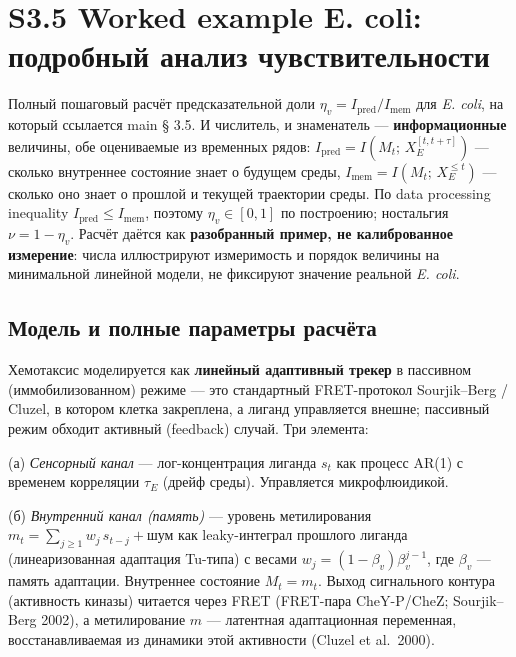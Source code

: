 \documentclass[pdflatex,sn-mathphys-ay]{sn-jnl}
\begin{document}
\section*{S3.5 Worked example E. coli: подробный анализ чувствительности}\label{s3.5-worked-example-e.-coli-ux43fux43eux434ux440ux43eux431ux43dux44bux439-ux430ux43dux430ux43bux438ux437-ux447ux443ux432ux441ux442ux432ux438ux442ux435ux43bux44cux43dux43eux441ux442ux438}

Полный пошаговый расчёт предсказательной доли \(\eta_v = I_{\text{pred}}/I_{\text{mem}}\) для \emph{E. coli}, на который ссылается main § 3.5. И числитель, и знаменатель --- \textbf{информационные} величины, обе оцениваемые из временных рядов: \(I_{\text{pred}} = I(M_t;\, X_E^{[t, t+\tau]})\) --- сколько внутреннее состояние знает о будущем среды, \(I_{\text{mem}} = I(M_t;\, X_E^{\le t})\) --- сколько оно знает о прошлой и текущей траектории среды. По data processing inequality \(I_{\text{pred}} \le I_{\text{mem}}\), поэтому \(\eta_v \in [0, 1]\) по построению; ностальгия \(\nu = 1 - \eta_v\). Расчёт даётся как \textbf{разобранный пример, не калиброванное измерение}: числа иллюстрируют измеримость и порядок величины на минимальной линейной модели, не фиксируют значение реальной \emph{E. coli}.

\subsection*{Модель и полные параметры расчёта}\label{ux43cux43eux434ux435ux43bux44c-ux438-ux43fux43eux43bux43dux44bux435-ux43fux430ux440ux430ux43cux435ux442ux440ux44b-ux440ux430ux441ux447ux451ux442ux430}

Хемотаксис моделируется как \textbf{линейный адаптивный трекер} в пассивном (иммобилизованном) режиме --- это стандартный FRET-протокол Sourjik--Berg / Cluzel, в котором клетка закреплена, а лиганд управляется внешне; пассивный режим обходит активный (feedback) случай. Три элемента:

(а) \emph{Сенсорный канал} --- лог-концентрация лиганда \(s_t\) как процесс AR(1) с временем корреляции \(\tau_E\) (дрейф среды). Управляется микрофлюидикой.

(б) \emph{Внутренний канал (память)} --- уровень метилирования \(m_t = \sum_{j \ge 1} w_j\, s_{t-j} + \text{шум}\) как leaky-интеграл прошлого лиганда (линеаризованная адаптация Tu-типа) с весами \(w_j = (1-\beta_v)\beta_v^{j-1}\), где \(\beta_v\) --- память адаптации. Внутреннее состояние \(M_t = m_t\). Выход сигнального контура (активность киназы) читается через FRET (FRET-пара CheY-P/CheZ; Sourjik--Berg 2002), а метилирование \(m\) --- латентная адаптационная переменная, восстанавливаемая из динамики этой активности (Cluzel et al.~2000).
\end{document}
